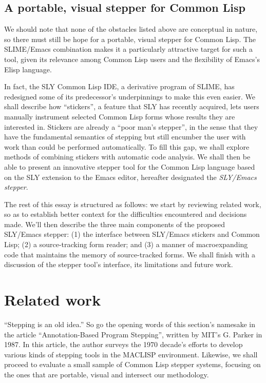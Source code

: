 \documentclass[sigconf]{acmart}
\begin{document}
\subsection{A portable, visual stepper for Common
  Lisp}

We should note that none of the obstacles listed above are conceptual
in nature, so there must still be hope for a portable, visual stepper
for Common Lisp. The SLIME/Emacs combination makes it a particularly
attractive target for such a tool, given its relevance among Common
Lisp users and the flexibility of Emacs's Elisp language.

In fact, the SLY Common Lisp IDE\cite{sly}, a derivative program of
SLIME, has redesigned some of its predecessor's underpinnings to make
this even easier.  We shall describe how ``stickers'', a feature that
SLY has recently acquired, lets users manually instrument selected
Common Lisp forms whose results they are interested in.  Stickers are
already a ``poor man's stepper'', in the sense that they have the
fundamental semantics of stepping but still encumber the user with
work than could be performed automatically.  To fill this gap, we
shall explore methods of combining stickers with automatic code
analysis.  We shall then be able to present an innovative stepper tool
for the Common Lisp language based on the SLY extension to the Emacs
editor, hereafter designated the \emph{SLY/Emacs stepper}.


The rest of this essay is structured as follows: we start by reviewing
related work, so as to establish better context for the difficulties
encountered and decisions made.  We'll then describe the three main
components of the proposed SLY/Emacs stepper: (1) the interface
between SLY/Emacs stickers and Common Lisp; (2) a source-tracking form
reader; and (3) a manner of macroexpanding code that maintains the
memory of source-tracked forms.  We shall finish with a discussion of
the stepper tool's interface, its limitations and future work.

\section{Related work}

``Stepping is an old idea.''  So go the opening words of this
section's namesake in the article ``Annotation-Based Program
Stepping'', written by MIT's G. Parker in 1987\cite{annotation-based}.
In this article, the author surveys the 1970 decade's efforts to
develop various kinds of stepping tools in the MACLISP environment.
Likewise, we shall proceed to evaluate a small sample of Common Lisp
stepper systems, focusing on the ones that are portable, visual and
intersect our methodology.
\end{document}

